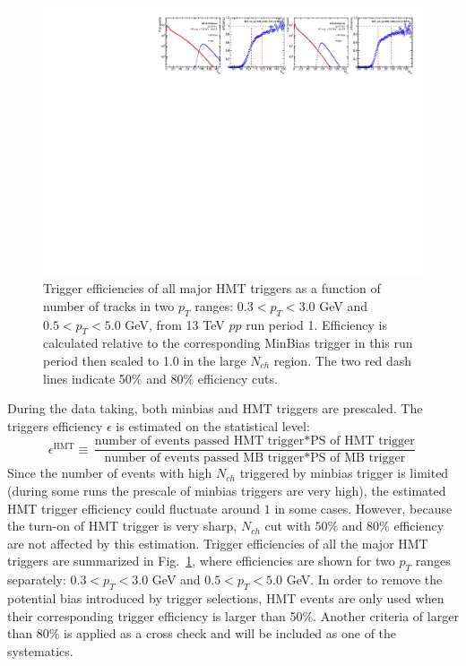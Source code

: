 \begin{figure}[H]
\centering
\includegraphics[width=1.\linewidth]{figs/sec_evtSlc/trigEff_pp13_run1/trigEff_Trig15.pdf}
\caption{Trigger efficiencies of all major HMT triggers as a function of number of tracks in two $p_{T}$ ranges: $0.3<p_{T}<3.0$ GeV and $0.5<p_{T}<5.0$ GeV, from 13 TeV $pp$ run period 1. Efficiency is calculated relative to the corresponding MinBias trigger in this run period then scaled to 1.0 in the large $N_{ch}$ region. The two red dash lines indicate 50$\%$ and 80$\%$ efficiency cuts.}
\label{fig:trigEff_pp13_run1}
\end{figure}
During the data taking, both minbias and HMT triggers are prescaled. The triggers efficiency $\epsilon$ is estimated on the statistical level:
\begin{equation}
\epsilon^{\text{HMT}}\equiv\frac{\text{number of events passed HMT trigger}*\text{PS of HMT trigger}}{\text{number of events passed MB trigger}*\text{PS of MB trigger}}
\end{equation}
Since the number of events with high $N_{ch}$ triggered by minbias trigger is limited (during some runs the prescale of minbias triggers are very high), the estimated HMT trigger efficiency could fluctuate around $1$ in some cases. However, because the turn-on of HMT trigger is very sharp, $N_{ch}$ cut with $50\%$ and $80\%$ efficiency are not affected by this estimation. Trigger efficiencies of all the major HMT triggers are summarized in Fig.~\ref{fig:trigEff_pp13_run1}, where efficiencies are shown for two $p_{T}$ ranges separately: $0.3<p_{T}<3.0$ GeV and $0.5<p_{T}<5.0$ GeV. In order to remove the potential bias introduced by trigger selections, HMT events are only used when their corresponding trigger efficiency is larger than 50$\%$. Another criteria of larger than 80$\%$ is applied as a cross check and will be included as one of the systematics.



